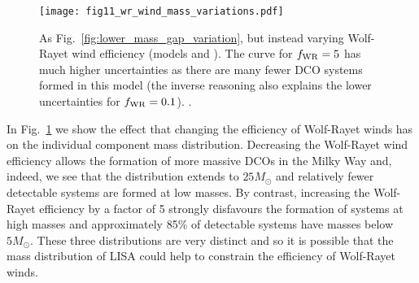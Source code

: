 \begin{figure}[tb]
    \centering
    \texttt{[image: fig11\_wr\_wind\_mass\_variations.pdf]}
    \caption{As Fig.~\ref{fig:lower_mass_gap_variation}, but instead varying Wolf-Rayet wind efficiency (models \modWRLow{} and \modWRHigh{}). The curve for $f_{\rm WR} = 5$ has much higher uncertainties as there are many fewer DCO systems formed in this model (the inverse reasoning also explains the lower uncertainties for $f_{\rm WR} = 0.1$). \href{https://github.com/TomWagg/detecting-DCOs-in-LISA/blob/main/paper/figures/fig11_wr_wind_mass_variations.pdf}{\faFileImage} \href{https://github.com/TomWagg/detecting-DCOs-in-LISA/blob/main/paper/figure_notebooks/variations.ipynb}{\faBook}.}
    \label{fig:wr_wind_mass_variations}
\end{figure}

In Fig.~\ref{fig:wr_wind_mass_variations} we show the effect that changing the efficiency of Wolf-Rayet winds has on the individual component mass distribution. Decreasing the Wolf-Rayet wind efficiency allows the formation of more massive DCOs in the Milky Way and, indeed, we see that the distribution extends to $25 \unit{M_{\odot}}$ and relatively fewer detectable systems are formed at low masses. By contrast, increasing the Wolf-Rayet efficiency by a factor of 5 strongly disfavours the formation of systems at high masses and approximately 85\% of detectable systems have masses below $5 \unit{M_{\odot}}$. These three distributions are very distinct and so it is possible that the mass distribution of LISA could help to constrain the efficiency of Wolf-Rayet winds.
